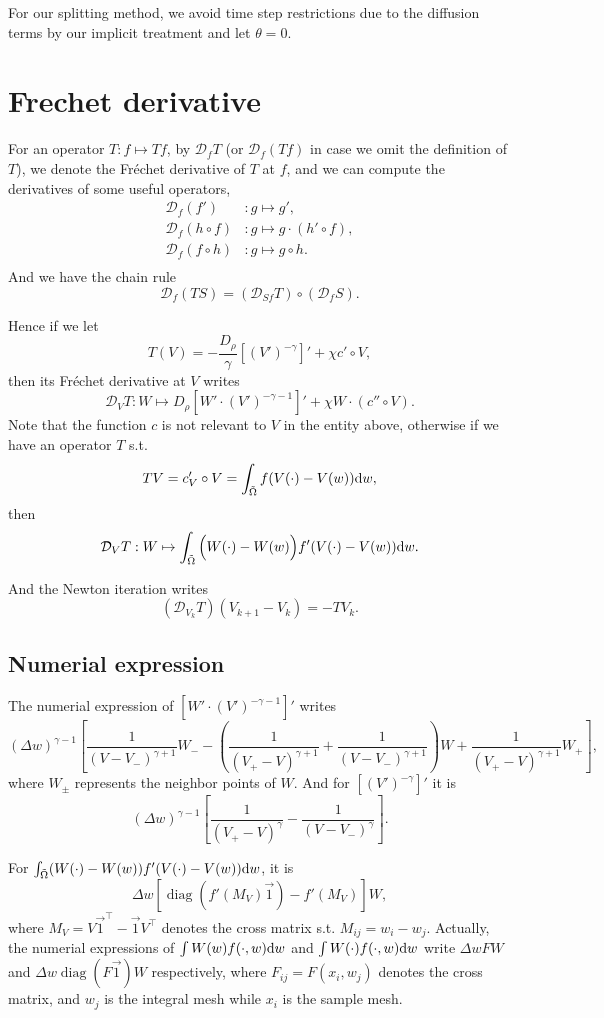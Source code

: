\documentclass{article}
\newcommand{\frender}{\mathcal D}
\begin{document}
  For our splitting method, we avoid time step restrictions due to the diffusion terms by our
  implicit treatment and let $\theta = 0$.

  \section{Frechet derivative}
  For an operator $T: f\mapsto Tf$, by $\frender_fT$ (or $\frender_f(Tf)$ in case we omit the definition
  of $T$), we denote the Fr\'echet derivative
  of $T$ at $f$, and we can compute the derivatives of some useful operators, 
  \[
    \begin{aligned}
      \frender_f(f')      &:g\mapsto g', \\
      \frender_f(h\circ f)&:g\mapsto g\cdot(h'\circ f), \\
      \frender_f(f\circ h)&:g\mapsto g\circ h. \\
    \end{aligned}
  \]
  And we have the chain rule
  \[
    \frender_f(TS) = \left(\frender_{Sf}T\right) \circ \left(\frender_fS\right).
  \]

  Hence if we let
  \[
    T(V) = -\frac{D_\rho}{\gamma}\left[(V')^{-\gamma}\right]'
    + \chi c'\circ V,
  \]
  then its Fr\'echet derivative at $V$ writes
  \[
    \frender_V T: W\mapsto
    D_\rho\left[W'\cdot (V')^{-\gamma - 1}\right]' + \chi W\cdot(c''\circ V).
  \]
  Note that the function $c$ is not relevant to $V$ in the entity above,
  otherwise if we have an operator $T$ s.t.
  \[
    TV = c_V'\circ V = \int_{\tilde\Omega} f(V(\cdot) - V(w))\mathrm d w,
  \]
  then
  \[
    \frender_VT:W \mapsto \int_{\tilde\Omega}\Big(W(\cdot) - W(w)\Big)f'(V(\cdot) - V(w))\diff w.
  \]

  And the Newton iteration writes
  \[
    (\frender_{V_k} T)(V_{k + 1} - V_k) = - TV_k.
  \]

  \subsection{Numerial expression}
  The numerial expression of $[W'\cdot(V')^{-\gamma - 1}]'$ writes
  \[
    (\Delta w)^{\gamma - 1}
    \left[
      \frac{1}{(V - V_-)^{\gamma + 1}}W_-
      -\left(\frac{1}{(V_+ - V)^{\gamma + 1}} + \frac{1}{(V - V_-)^{\gamma + 1}}\right)W
      +\frac{1}{(V_+ - V)^{\gamma + 1}}W_+
    \right],
  \]
  where $W_{\pm}$ represents the neighbor points of $W$.
  And for $[(V')^{-\gamma}]'$ it is
  \[
    (\Delta w)^{\gamma - 1}
    \left[
      \frac1{(V_+ - V)^{\gamma}} - \frac1{(V - V_-)^\gamma}
    \right].
  \]

  For $\int_{\tilde\Omega}(W(\cdot) - W(w))f'(V(\cdot) - V(w))\mathrm d w$, it is
  \[
    \Delta w\left[\operatorname{diag}\left(f'(M_V)\vec 1\right) - f'(M_V)\right]W,
  \]
  where $M_V = V\vec 1^\top - \vec 1 V^\top$ denotes the cross matrix s.t. $M_{ij} = w_i - w_j$.
  Actually, the numerial expressions of $\int W(w)f(\cdot, w)\mathrm d w$ and $\int W(\cdot)f(\cdot, w)\mathrm d w$
  write $\Delta w FW$ and $\Delta w\operatorname{diag}(F\vec 1)W$ respectively,
  where $F_{ij} = F(x_i, w_j)$ denotes the cross matrix, and $w_j$ is the integral mesh while $x_i$ is
  the sample mesh.
\end{document}
